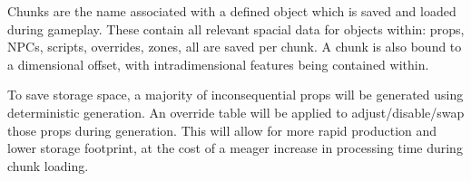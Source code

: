 Chunks are the name associated with a defined object which is saved and loaded during gameplay. These contain all relevant spacial data for objects within: props, NPCs, scripts, overrides, zones, all are saved per chunk. A chunk is also bound to a dimensional offset, with intradimensional features being contained within. 

To save storage space, a majority of inconsequential props will be generated using deterministic generation. An override table will be applied to adjust/disable/swap those props during generation. This will allow for more rapid production and lower storage footprint, at the cost of a meager increase in processing time during chunk loading.